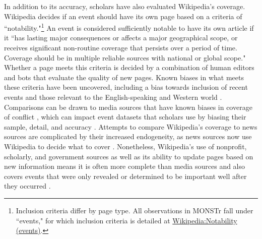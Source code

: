 \documentclass[fleqn,12pt]{article}
\begin{document}
In addition to its accuracy, scholars have also evaluated Wikipedia's coverage. Wikipedia decides if an event should have its own page based on a criteria of ``notability."\footnote{Inclusion criteria differ by page type. All observations in MONSTr fall under ``events," for which inclusion criteria is detailed at \href{https://en.wikipedia.org/wiki/Wikipedia:Notability_(events)}{Wikipedia:Notability (events)}.} An event is considered sufficiently notable to have its own article if it ``has lasting major consequences or affects a major geographical scope, or receives significant non-routine coverage that persists over a period of time. Coverage should be in multiple reliable sources with national or global scope." Whether a page meets this criteria is decided by a combination of human editors and bots that evaluate the quality of new pages. Known biases in what meets these criteria have been uncovered, including a bias towards inclusion of recent events \citep{royal_whatwikipediawhat_2009} and those relevant to the English-speaking and Western world \citep{callahan_culturalbiaswikipedia_2011}. Comparisons can be drawn to media sources that have known biases in coverage of conflict \citep{dietrich_knownunknownsmedia_2020, croicu_reportingnonfatalconflict_2022}, which can impact event datasets that scholars use by biasing their sample, detail, and accuracy \citep{douglass_introducingicbedataset_2022}. Attempts to compare Wikipedia's coverage to news sources are complicated by their increased endogeneity, as news sources now use Wikipedia to decide what to cover \citep{ren_itnotencyclopedia_2023}. Nonetheless, Wikipedia's use of nonprofit, scholarly, and government sources as well as its ability to update pages based on new information means it is often more complete than media sources and also covers events that were only revealed or determined to be important well after they occurred \citep{gildersleve_newshistoryidentifying_2022}.
\end{document}
